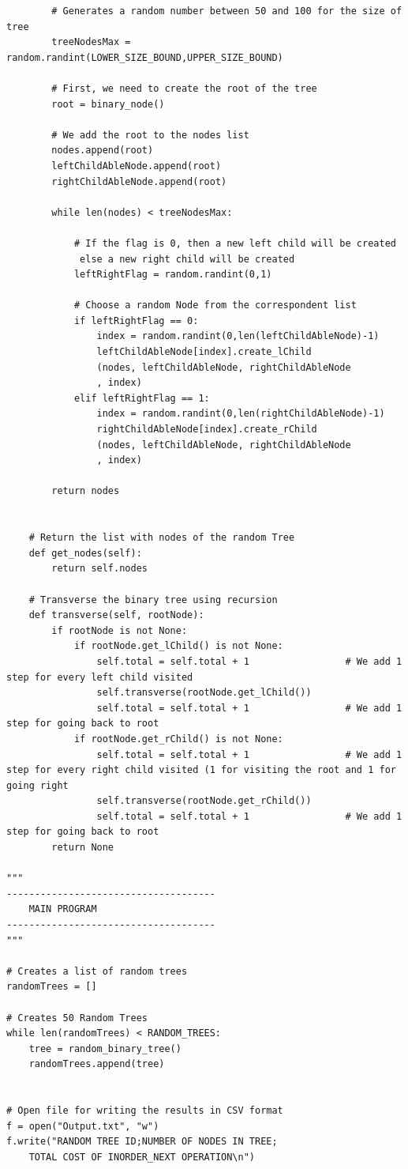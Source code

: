 \documentclass[12p]{report}
\begin{document}
\begin{lstlisting}
		# Generates a random number between 50 and 100 for the size of tree
		treeNodesMax = random.randint(LOWER_SIZE_BOUND,UPPER_SIZE_BOUND)

		# First, we need to create the root of the tree
		root = binary_node()

		# We add the root to the nodes list
		nodes.append(root)
		leftChildAbleNode.append(root)
		rightChildAbleNode.append(root)

		while len(nodes) < treeNodesMax:

			# If the flag is 0, then a new left child will be created
			 else a new right child will be created
			leftRightFlag = random.randint(0,1)

			# Choose a random Node from the correspondent list
			if leftRightFlag == 0:
				index = random.randint(0,len(leftChildAbleNode)-1)
				leftChildAbleNode[index].create_lChild
				(nodes, leftChildAbleNode, rightChildAbleNode
				, index)
			elif leftRightFlag == 1:
				index = random.randint(0,len(rightChildAbleNode)-1)
				rightChildAbleNode[index].create_rChild
				(nodes, leftChildAbleNode, rightChildAbleNode
				, index)

		return nodes

		
	# Return the list with nodes of the random Tree
	def get_nodes(self):
		return self.nodes

	# Transverse the binary tree using recursion
	def transverse(self, rootNode):
		if rootNode is not None:
			if rootNode.get_lChild() is not None:
				self.total = self.total + 1					# We add 1 step for every left child visited
				self.transverse(rootNode.get_lChild())
				self.total = self.total + 1 				# We add 1 step for going back to root
			if rootNode.get_rChild() is not None:
				self.total = self.total + 1 				# We add 1 step for every right child visited (1 for visiting the root and 1 for going right
				self.transverse(rootNode.get_rChild())
				self.total = self.total + 1 				# We add 1 step for going back to root
		return None

"""
-------------------------------------
	MAIN PROGRAM 
-------------------------------------
"""

# Creates a list of random trees
randomTrees = []

# Creates 50 Random Trees
while len(randomTrees) < RANDOM_TREES:
	tree = random_binary_tree()
	randomTrees.append(tree)


# Open file for writing the results in CSV format
f = open("Output.txt", "w")
f.write("RANDOM TREE ID;NUMBER OF NODES IN TREE;
	TOTAL COST OF INORDER_NEXT OPERATION\n")


\end{lstlisting}
\end{document}
